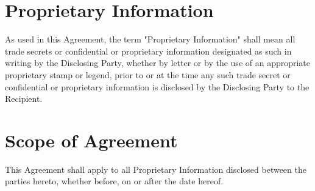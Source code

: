 \documentclass[12pt]{article}
\begin{document}
\section{Proprietary Information}
As used in this Agreement, the term "Proprietary Information" shall mean all trade secrets or confidential or proprietary information designated as such in writing by the Disclosing Party, whether by letter or by the use of an appropriate proprietary stamp or legend, prior to or at the time any such trade secret or confidential or proprietary information is disclosed by the Disclosing Party to the Recipient.

\section{Scope of Agreement}
This Agreement shall apply to all Proprietary Information disclosed between the parties hereto, whether before, on or after the date hereof.
\end{document}
